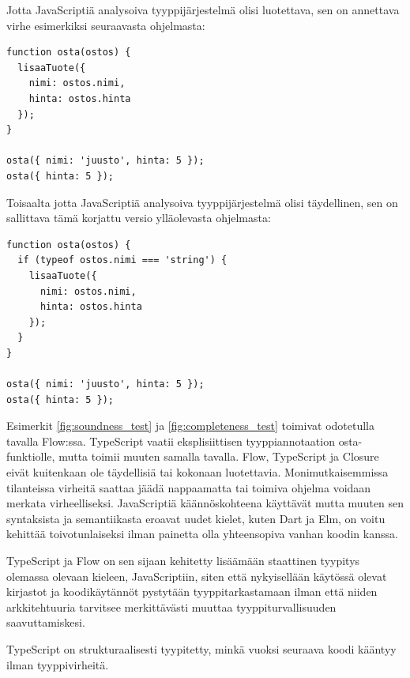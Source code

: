 Jotta JavaScriptiä analysoiva tyyppijärjestelmä olisi luotettava, sen on
annettava virhe esimerkiksi seuraavasta ohjelmasta:

\begin{minipage}{\linewidth}
\begin{lstlisting}[caption={Virheellinen JavaScript-ohjelma: Lisätyllä tuotteella ei ole nimeä.}]
function osta(ostos) {
  lisaaTuote({
    nimi: ostos.nimi,
    hinta: ostos.hinta
  });
}

osta({ nimi: 'juusto', hinta: 5 });
osta({ hinta: 5 });
\end{lstlisting}
\label{fig:soundness_test}
\end{minipage}

Toisaalta jotta JavaScriptiä analysoiva tyyppijärjestelmä olisi täydellinen,
sen on sallittava tämä korjattu versio ylläolevasta ohjelmasta:

\begin{minipage}{\linewidth}
\begin{lstlisting}[caption={Toimiva JavaScript-ohjelma: Virheelliseltä kutsulta on suojauduttu tarkistuksella.}]
function osta(ostos) {
  if (typeof ostos.nimi === 'string') {
    lisaaTuote({
      nimi: ostos.nimi,
      hinta: ostos.hinta
    });
  }
}

osta({ nimi: 'juusto', hinta: 5 });
osta({ hinta: 5 });
\end{lstlisting}
\label{fig:completeness_test}
\end{minipage}

Esimerkit \ref{fig:soundness_test} ja \ref{fig:completeness_test} toimivat
odotetulla tavalla Flow:ssa. TypeScript vaatii eksplisiittisen tyyppiannotaation
osta-funktiolle, mutta toimii muuten samalla tavalla. Flow, TypeScript ja
Closure eivät kuitenkaan ole täydellisiä tai kokonaan luotettavia.
Monimutkaisemmissa tilanteissa virheitä saattaa jäädä nappaamatta tai toimiva
ohjelma voidaan merkata virheelliseksi. JavaScriptiä käännöskohteena käyttävät
mutta muuten sen syntaksista ja semantiikasta eroavat uudet kielet,
kuten Dart ja Elm, on voitu kehittää toivotunlaiseksi ilman painetta olla
yhteensopiva vanhan koodin kanssa.

TypeScript ja Flow on sen sijaan kehitetty lisäämään staattinen tyypitys
olemassa olevaan kieleen, JavaScriptiin, siten että nykyisellään käytössä
olevat kirjastot ja koodikäytännöt pystytään tyyppitarkastamaan ilman että
niiden arkkitehtuuria tarvitsee merkittävästi muuttaa tyyppiturvallisuuden
saavuttamiskesi.

TypeScript on strukturaalisesti tyypitetty, minkä vuoksi seuraava koodi kääntyy
ilman tyyppivirheitä.

